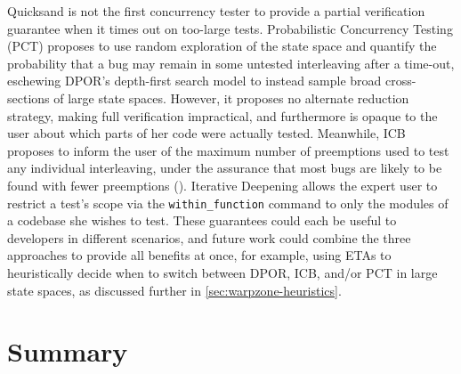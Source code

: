 Quicksand is not the first concurrency tester to provide a partial verification guarantee
when it times out on too-large tests.
Probabilistic Concurrency Testing (PCT)
\cite{randomized-scheduler}
proposes to use random exploration of the state space and quantify the probability
that a bug may remain in some untested interleaving after a time-out,
eschewing DPOR's depth-first search model to
instead sample broad cross-sections of large state spaces.
However, it proposes no alternate reduction strategy, making full verification impractical,
and furthermore is opaque to the user about which parts of her code were actually tested.
Meanwhile, ICB proposes to inform the user
of the maximum number of preemptions used to test any individual interleaving,
under the assurance that most bugs are likely to be found with fewer preemptions ().
Iterative Deepening
allows the expert user
to restrict a test's scope via the {\tt within\_function} command to only the modules of a codebase she wishes to test.
These guarantees could each be useful to developers in different scenarios,
and future work could combine the three approaches to provide all benefits at once,
for example, using ETAs to heuristically decide when to switch between DPOR, ICB, and/or PCT in large state spaces,
as discussed further in \cref{sec:warpzone-heuristics}.


\section{Summary}

